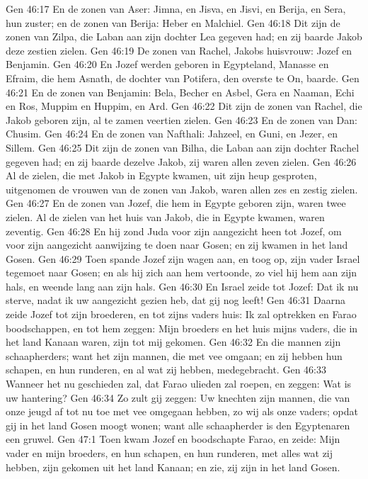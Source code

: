 Gen 46:17  En de zonen van Aser: Jimna, en Jisva, en Jisvi, en Berija, en Sera, hun zuster; en de zonen van Berija: Heber en Malchiel.
Gen 46:18  Dit zijn de zonen van Zilpa, die Laban aan zijn dochter Lea gegeven had; en zij baarde Jakob deze zestien zielen.
Gen 46:19  De zonen van Rachel, Jakobs huisvrouw: Jozef en Benjamin.
Gen 46:20  En Jozef werden geboren in Egypteland, Manasse en Efraim, die hem Asnath, de dochter van Potifera, den overste te On, baarde.
Gen 46:21  En de zonen van Benjamin: Bela, Becher en Asbel, Gera en Naaman, Echi en Ros, Muppim en Huppim, en Ard.
Gen 46:22  Dit zijn de zonen van Rachel, die Jakob geboren zijn, al te zamen veertien zielen.
Gen 46:23  En de zonen van Dan: Chusim.
Gen 46:24  En de zonen van Nafthali: Jahzeel, en Guni, en Jezer, en Sillem.
Gen 46:25  Dit zijn de zonen van Bilha, die Laban aan zijn dochter Rachel gegeven had; en zij baarde dezelve Jakob, zij waren allen zeven zielen.
Gen 46:26  Al de zielen, die met Jakob in Egypte kwamen, uit zijn heup gesproten, uitgenomen de vrouwen van de zonen van Jakob, waren allen zes en zestig zielen.
Gen 46:27  En de zonen van Jozef, die hem in Egypte geboren zijn, waren twee zielen. Al de zielen van het huis van Jakob, die in Egypte kwamen, waren zeventig.
Gen 46:28  En hij zond Juda voor zijn aangezicht heen tot Jozef, om voor zijn aangezicht aanwijzing te doen naar Gosen; en zij kwamen in het land Gosen.
Gen 46:29  Toen spande Jozef zijn wagen aan, en toog op, zijn vader Israel tegemoet naar Gosen; en als hij zich aan hem vertoonde, zo viel hij hem aan zijn hals, en weende lang aan zijn hals.
Gen 46:30  En Israel zeide tot Jozef: Dat ik nu sterve, nadat ik uw aangezicht gezien heb, dat gij nog leeft!
Gen 46:31  Daarna zeide Jozef tot zijn broederen, en tot zijns vaders huis: Ik zal optrekken en Farao boodschappen, en tot hem zeggen: Mijn broeders en het huis mijns vaders, die in het land Kanaan waren, zijn tot mij gekomen.
Gen 46:32  En die mannen zijn schaapherders; want het zijn mannen, die met vee omgaan; en zij hebben hun schapen, en hun runderen, en al wat zij hebben, medegebracht.
Gen 46:33  Wanneer het nu geschieden zal, dat Farao ulieden zal roepen, en zeggen: Wat is uw hantering?
Gen 46:34  Zo zult gij zeggen: Uw knechten zijn mannen, die van onze jeugd af tot nu toe met vee omgegaan hebben, zo wij als onze vaders; opdat gij in het land Gosen moogt wonen; want alle schaapherder is den Egyptenaren een gruwel.
Gen 47:1  Toen kwam Jozef en boodschapte Farao, en zeide: Mijn vader en mijn broeders, en hun schapen, en hun runderen, met alles wat zij hebben, zijn gekomen uit het land Kanaan; en zie, zij zijn in het land Gosen.
